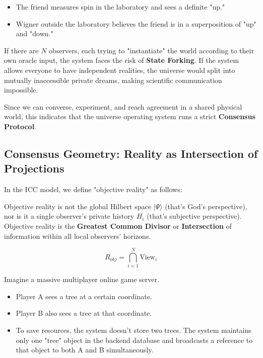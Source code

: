 \begin{itemize}
\item The friend measures spin in the laboratory and sees a definite "up."

\item Wigner outside the laboratory believes the friend is in a superposition of "up" and "down."
\end{itemize}

If there are $N$ observers, each trying to "instantiate" the world according to their own oracle input, the system faces the risk of \textbf{State Forking}. If the system allows everyone to have independent realities, the universe would split into mutually inaccessible private dreams, making scientific communication impossible.

Since we can converse, experiment, and reach agreement in a shared physical world, this indicates that the universe operating system runs a strict \textbf{Consensus Protocol}.

\subsection{Consensus Geometry: Reality as Intersection of Projections}

In the ICC model, we define "objective reality" as follows:

\begin{definition}
Objective reality is not the global Hilbert space $|\Psi\rangle$ (that's God's perspective), nor is it a single observer's private history $H_i$ (that's subjective perspective). Objective reality is the \textbf{Greatest Common Divisor} or \textbf{Intersection} of information within all local observers' horizons.

\begin{equation}
R_{obj} = \bigcap_{i=1}^N \text{View}_i
\end{equation}
\end{definition}

Imagine a massive multiplayer online game server.

\begin{itemize}
\item Player A sees a tree at a certain coordinate.

\item Player B also sees a tree at that coordinate.

\item To save resources, the system doesn't store two trees. The system maintains only one "tree" object in the backend database and broadcasts a reference to that object to both A and B simultaneously.
\end{itemize}

